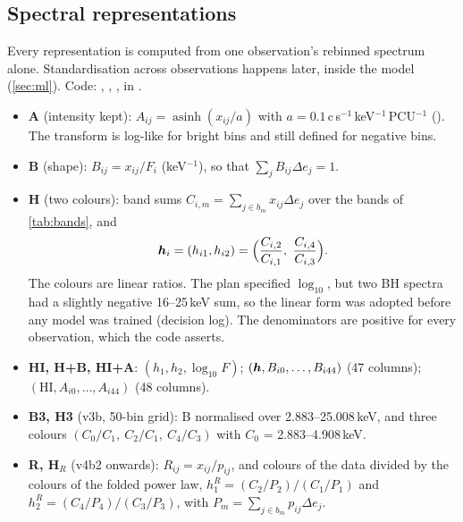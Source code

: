 \subsection{Spectral representations}\label{sec:reps}
Every representation is computed from one observation's rebinned spectrum alone. Standardisation across observations
happens later, inside the model (\cref{sec:ml}). Code: , ,
,  in .
\begin{itemize}
\item \textbf{A} (intensity kept): $A_{ij}=\operatorname{asinh}(x_{ij}/a)$ with $a=0.1$\,c\,s$^{-1}$\,keV$^{-1}$\,PCU$^{-1}$
(). The transform is log-like for bright bins and still defined for negative bins.
\item \textbf{B} (shape): $B_{ij}=x_{ij}/F_i$ (keV$^{-1}$), so that $\sum_jB_{ij}\Delta e_j=1$.
\item \textbf{H} (two colours): band sums $C_{i,m}=\sum_{j\in b_m}x_{ij}\Delta e_j$ over the bands of \cref{tab:bands}, and
\begin{equation}
\vect h_i=(h_{i1},h_{i2})=\Bigl(\frac{C_{i,2}}{C_{i,1}},\ \frac{C_{i,4}}{C_{i,3}}\Bigr).\label{eq:H}
\end{equation}
The colours are linear ratios. The plan specified $\log_{10}$, but two BH spectra had a slightly negative 16--25\,keV sum,
so the linear form was adopted before any model was trained (decision log). The denominators are positive for every
observation, which the code asserts.
\item \textbf{HI, H+B, HI+A}: $(h_1,h_2,\log_{10}F)$; $(\bm{h},B_{i0},\dots,B_{i44})$ (47 columns);
$(\mathrm{HI},A_{i0},\dots,A_{i44})$ (48 columns).
\item \textbf{B3, H3} (v3b, 50-bin grid): B normalised over 2.883--25.008\,keV, and three colours
$(C_0/C_1,\ C_2/C_1,\ C_4/C_3)$ with $C_0$ = 2.883--4.908\,keV.
\item \textbf{R, H$_R$} (v4b2 onwards): $R_{ij}=x_{ij}/p_{ij}$, and colours of the data divided by the colours of the folded
power law, $h^R_1=(C_2/P_2)/(C_1/P_1)$ and $h^R_2=(C_4/P_4)/(C_3/P_3)$, with $P_m=\sum_{j\in b_m}p_{ij}\Delta e_j$.
\end{itemize}

